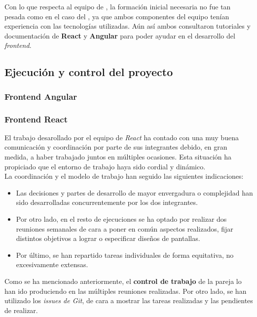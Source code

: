 \documentclass[11pt, a4paper, titlepage]{article}
\begin{document}
Con lo que respecta al equipo de , la formación inicial necesaria no fue tan pesada como en el caso del , ya que ambos componentes del equipo tenían experiencia con las tecnologías utilizadas. Aún así ambos consultaron tutoriales y documentación de \textbf{React} y \textbf{Angular} para poder ayudar en el desarrollo del \textit{frontend}.

\subsection{Ejecución y control del proyecto}

\subsubsection{Frontend Angular}

\subsubsection{Frontend React}


El trabajo desarollado por el equipo de \textit{React} ha contado con una muy buena comunicación y coordinación por parte de sus integrantes debido, en gran medida, a haber trabajado juntos en múltiples ocasiones. Esta situación ha propiciado que el entorno de trabajo haya sido cordial y dinámico. \\

La coordinación y el modelo de trabajo han seguido las siguientes indicaciones:

\begin{itemize}
    \item Las decisiones y partes de desarrollo de mayor envergadura o complejidad han sido desarrolladas concurrentemente por los dos integrantes. 
    \item Por otro lado, en el resto de ejecuciones se ha optado por realizar dos reuniones semanales de cara a poner en común aspectos realizados, fijar distintos objetivos a lograr o especificar diseños de pantallas.
    \item Por último, se han repartido tareas individuales de forma equitativa, no excesivamente extensas.
\end{itemize}

Como se ha mencionado anteriormente, el \textbf{control de trabajo} de la pareja lo han ido produciendo en las múltiples reuniones realizadas. Por otro lado, se han utilizado los \textit{issues de Git}, de cara a mostrar las tareas realizadas y las pendientes de realizar. \\
\end{document}
